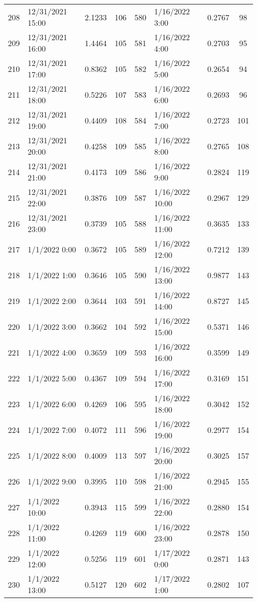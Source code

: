 \begin{center}
\begin{longtable}{llccllcc}
    208&12/31/2021 15:00   &2.1233&106&580&1/16/2022 3:00	    &0.2767&98  \\
    209&12/31/2021 16:00   &1.4464&105&581&1/16/2022 4:00	    &0.2703&95  \\
    210&12/31/2021 17:00   &0.8362&105&582&1/16/2022 5:00	    &0.2654&94  \\
    211&12/31/2021 18:00   &0.5226&107&583&1/16/2022 6:00	    &0.2693&96  \\
    212&12/31/2021 19:00   &0.4409&108&584&1/16/2022 7:00	    &0.2723&101 \\
    213&12/31/2021 20:00   &0.4258&109&585&1/16/2022 8:00	    &0.2765&108 \\
    214&12/31/2021 21:00   &0.4173&109&586&1/16/2022 9:00	    &0.2824&119 \\
    215&12/31/2021 22:00   &0.3876&109&587&1/16/2022 10:00	    &0.2967&129 \\
    216&12/31/2021 23:00   &0.3739&105&588&1/16/2022 11:00	    &0.3635&133 \\
    217&1/1/2022 0:00	   &0.3672&105&589&1/16/2022 12:00	    &0.7212&139 \\
    218&1/1/2022 1:00	   &0.3646&105&590&1/16/2022 13:00	    &0.9877&143 \\
    219&1/1/2022 2:00	   &0.3644&103&591&1/16/2022 14:00	    &0.8727&145 \\
    220&1/1/2022 3:00	   &0.3662&104&592&1/16/2022 15:00	    &0.5371&146 \\
    221&1/1/2022 4:00	   &0.3659&109&593&1/16/2022 16:00	    &0.3599&149 \\
    222&1/1/2022 5:00	   &0.4367&109&594&1/16/2022 17:00	    &0.3169&151 \\
    223&1/1/2022 6:00	   &0.4269&106&595&1/16/2022 18:00	    &0.3042&152 \\
    224&1/1/2022 7:00	   &0.4072&111&596&1/16/2022 19:00	    &0.2977&154 \\
    225&1/1/2022 8:00	   &0.4009&113&597&1/16/2022 20:00	    &0.3025&157 \\
    226&1/1/2022 9:00	   &0.3995&110&598&1/16/2022 21:00	    &0.2945&155 \\
    227&1/1/2022 10:00	   &0.3943&115&599&1/16/2022 22:00	    &0.2880&154 \\
    228&1/1/2022 11:00	   &0.4269&119&600&1/16/2022 23:00	    &0.2878&150 \\
    229&1/1/2022 12:00	   &0.5256&119&601&1/17/2022 0:00	    &0.2871&143 \\
    230&1/1/2022 13:00	   &0.5127&120&602&1/17/2022 1:00	    &0.2802&107 \\

\end{longtable}
\end{center}
